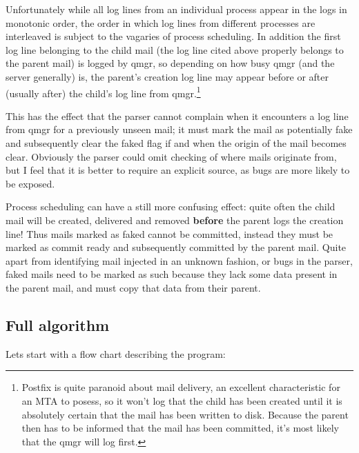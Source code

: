 \documentclass[a4paper,12pt,draft]{article}
\begin{document}
\begin{enumerate}
        Unfortunately while all log lines from an individual process appear
        in the logs in monotonic order, the order in which log lines from
        different processes are interleaved is subject to the vagaries of
        process scheduling.  In addition the first log line belonging to
        the child mail (the log line cited above properly belongs to the
        parent mail) is logged by qmgr, so depending on how busy qmgr (and
        the server generally) is, the parent's creation log line may appear
        before or after (usually after) the child's log line from
        qmgr.\footnote{Postfix is quite paranoid about mail delivery, an
        excellent characteristic for an MTA to posess, so it won't log that
        the child has been created until it is absolutely certain that the
        mail has been written to disk.  Because the parent then has to be
        informed that the mail has been committed, it's most likely that
        the qmgr will log first.}

        This has the effect that the parser cannot complain when it
        encounters a log line from qmgr for a previously unseen mail; it
        must mark the mail as potentially fake and subsequently clear the
        faked flag if and when the origin of the mail becomes clear.
        Obviously the parser could omit checking of where mails originate
        from, but I feel that it is better to require an explicit source,
        as bugs are more likely to be exposed.

        Process scheduling can have a still more confusing effect: quite
        often the child mail will be created, delivered and removed
        \textbf{before} the parent logs the creation line!  Thus mails
        marked as faked cannot be committed, instead they must be marked as
        commit ready and subsequently committed by the parent mail.  Quite
        apart from identifying mail injected in an unknown fashion, or bugs
        in the parser, faked mails need to be marked as such because they
        lack some data present in the parent mail, and must copy that data
        from their parent.


\end{enumerate}

\subsection{Full algorithm}

Lets start with a flow chart describing the program:
\end{document}
